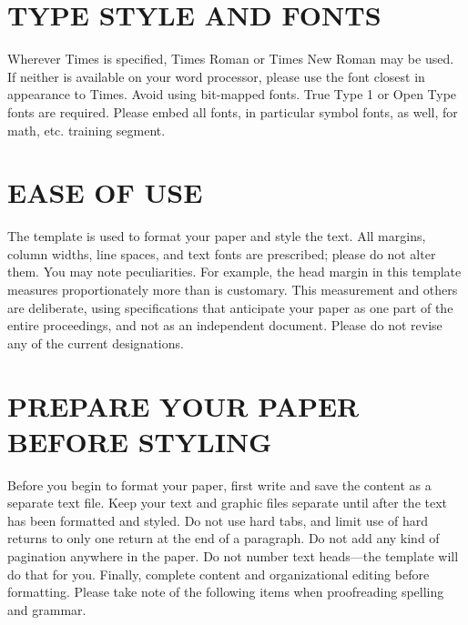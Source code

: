 \documentclass[journal]{IEEEtran}
\begin{document}
\section{TYPE STYLE AND FONTS}

Wherever Times is specified, Times Roman or Times New Roman may be used. If neither is available on your word processor, please use the font closest in appearance to Times. Avoid using bit-mapped fonts. True Type 1 or Open Type fonts are required. Please embed all fonts, in particular symbol fonts, as well, for math, etc. training segment.

\section{EASE OF USE}

The template is used to format your paper and style the text. All margins, column widths, line spaces, and text fonts are prescribed; please do not alter them. You may note peculiarities. For example, the head margin in this template measures proportionately more than is customary. This measurement and others are deliberate, using specifications that anticipate your paper as one part of the entire proceedings, and not as an independent document. Please do not revise any of the current designations.
\section{PREPARE YOUR PAPER BEFORE STYLING}

Before you begin to format your paper, first write and save the content as a separate text file. Keep your text and graphic files separate until after the text has been formatted and styled. Do not use hard tabs, and limit use of hard returns to only one return at the end of a paragraph. Do not add any kind of pagination anywhere in the paper. Do not number text heads—the template will do that for you.
Finally, complete content and organizational editing before formatting. Please take note of the following items when proofreading spelling and grammar.
\end{document}
